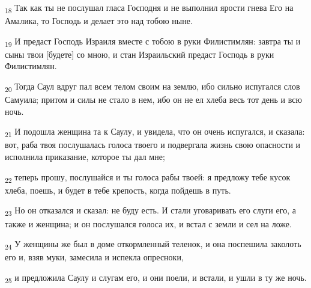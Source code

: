 \begin{tcolorbox}
\textsubscript{18} Так как ты не послушал гласа Господня и не выполнил ярости гнева Его на Амалика, то Господь и делает это над тобою ныне.
\end{tcolorbox}
\begin{tcolorbox}
\textsubscript{19} И предаст Господь Израиля вместе с тобою в руки Филистимлян: завтра ты и сыны твои [будете] со мною, и стан Израильский предаст Господь в руки Филистимлян.
\end{tcolorbox}
\begin{tcolorbox}
\textsubscript{20} Тогда Саул вдруг пал всем телом своим на землю, ибо сильно испугался слов Самуила; притом и силы не стало в нем, ибо он не ел хлеба весь тот день и всю ночь.
\end{tcolorbox}
\begin{tcolorbox}
\textsubscript{21} И подошла женщина та к Саулу, и увидела, что он очень испугался, и сказала: вот, раба твоя послушалась голоса твоего и подвергала жизнь свою опасности и исполнила приказание, которое ты дал мне;
\end{tcolorbox}
\begin{tcolorbox}
\textsubscript{22} теперь прошу, послушайся и ты голоса рабы твоей: я предложу тебе кусок хлеба, поешь, и будет в тебе крепость, когда пойдешь в путь.
\end{tcolorbox}
\begin{tcolorbox}
\textsubscript{23} Но он отказался и сказал: не буду есть. И стали уговаривать его слуги его, а также и женщина; и он послушался голоса их, и встал с земли и сел на ложе.
\end{tcolorbox}
\begin{tcolorbox}
\textsubscript{24} У женщины же был в доме откормленный теленок, и она поспешила заколоть его и, взяв муки, замесила и испекла опресноки,
\end{tcolorbox}
\begin{tcolorbox}
\textsubscript{25} и предложила Саулу и слугам его, и они поели, и встали, и ушли в ту же ночь.
\end{tcolorbox}
